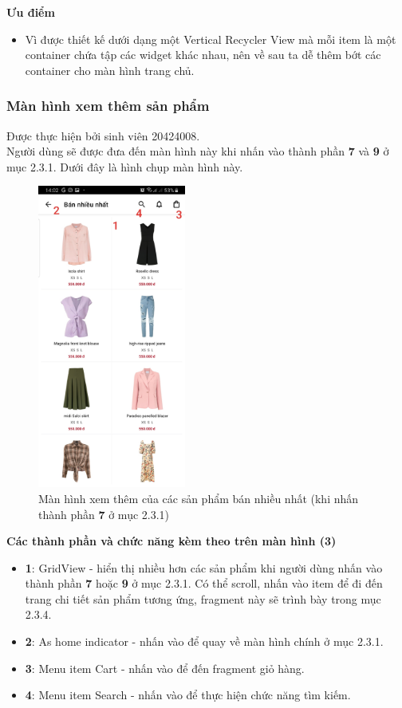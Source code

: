 \documentclass[12pt]{article}
\begin{document}
\indent \textbf{Ưu điểm}
\begin{itemize}
    \item Vì được thiết kế dưới dạng một Vertical Recycler View mà mỗi item là một container chứa tập các widget khác nhau, nên về sau ta dễ thêm bớt các container cho màn hình trang chủ.
\end{itemize}

\newpage
\subsubsection{Màn hình xem thêm sản phẩm}
Được thực hiện bởi sinh viên 20424008.\\

\indent Người dùng sẽ được đưa đến màn hình này khi nhấn vào thành phần \textbf{7} và \textbf{9} ở mục 2.3.1. Dưới đây là hình chụp màn hình này.

\begin{figure}[H]
    \centering
    \includegraphics[height=10cm]{images/15.png}
    \caption{Màn hình xem thêm của các sản phẩm bán nhiều nhất (khi nhấn thành phần \textbf{7} ở mục 2.3.1)}
\end{figure}

\indent \textbf{Các thành phần và chức năng kèm theo trên màn hình (3)}
\begin{itemize}
    \item \textbf{1}: GridView - hiển thị nhiều hơn các sản phẩm khi người dùng nhấn vào thành phần \textbf{7} hoặc \textbf{9} ở mục 2.3.1. Có thể scroll, nhấn vào item để đi đến trang chi tiết sản phẩm tương ứng, fragment này sẽ trình bày trong mục 2.3.4.
    \item \textbf{2}: As home indicator - nhấn vào để quay về màn hình chính ở mục 2.3.1.
    \item \textbf{3}: Menu item Cart - nhấn vào để đến fragment giỏ hàng.
    \item \textbf{4}: Menu item Search - nhấn vào để thực hiện chức năng tìm kiếm.
\end{itemize}
\end{document}
